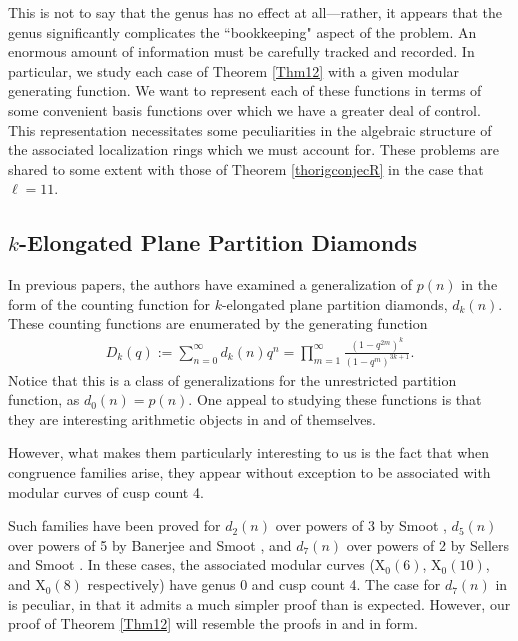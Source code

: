 \documentclass[reqno]{amsart}
\theoremstyle{definition}
\theoremstyle{remark}
\numberwithin{equation}{section}
\begin{document}
This is not to say that the genus has no effect at all---rather, it appears that the genus significantly complicates the ``bookkeeping" aspect of the problem.  An enormous amount of information must be carefully tracked and recorded.  In particular, we study each case of Theorem \ref{Thm12} with a given modular generating function.  We want to represent each of these functions in terms of some convenient basis functions over which we have a greater deal of control.  This representation necessitates some peculiarities in the algebraic structure of the associated localization rings which we must account for.  These problems are shared to some extent with those of Theorem \ref{thorigconjecR} in the case that $\ell=11$.  

\subsection{$k$-Elongated Plane Partition Diamonds}

In previous papers, the authors have examined a generalization of $p(n)$ in the form of the counting function for $k$-elongated plane partition diamonds, $d_k(n)$.  These counting functions are enumerated by the generating function \cite[equation (7.3)]{AndrewsPaule}
\begin{align*}
D_k(q) := \sum_{n=0}^{\infty}d_k(n)q^n = \prod_{m=1}^{\infty}\frac{(1-q^{2m})^k}{(1-q^m)^{3k+1}}.
\end{align*}  Notice that this is a class of generalizations for the unrestricted partition function, as $d_0(n)=p(n)$.  One appeal to studying these functions is that they are interesting arithmetic objects in and of themselves.

However, what makes them particularly interesting to us is the fact that when congruence families arise, they appear without exception to be associated with modular curves of cusp count 4.

Such families have been proved for $d_2(n)$ over powers of 3 by Smoot \cite{Smoot2}, $d_5(n)$ over powers of 5 by Banerjee and Smoot \cite{Banerjee}, and $d_7(n)$ over powers of 2 by Sellers and Smoot \cite{SellersS}.  In these cases, the associated modular curves ($\mathrm{X}_0(6)$, $\mathrm{X}_0(10)$, and $\mathrm{X}_0(8)$ respectively) have genus 0 and cusp count 4.  The case for $d_7(n)$ in \cite{SellersS} is peculiar, in that it admits a much simpler proof than is expected.  However, our proof of Theorem \ref{Thm12} will resemble the proofs in \cite{Smoot2} and \cite{Banerjee} in form.
\end{document}

